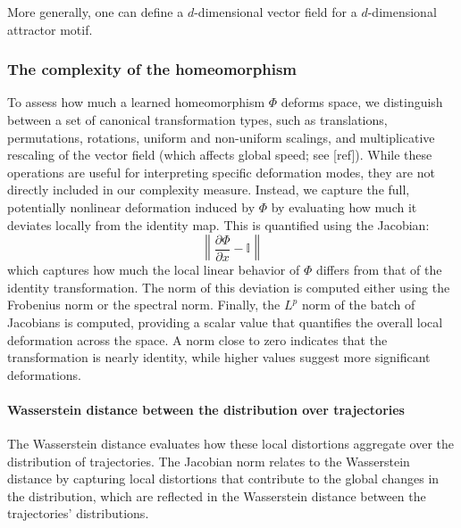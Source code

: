 \documentclass{article}
\theoremstyle{definition} \newtheorem{definition}{Definition}  \newtheorem{example}{Example}
\theoremstyle{remark} \newtheorem{remark}{Remark}
\newcounter{ct}
\begin{document}
More generally, one can define a $d$-dimensional vector field for a $d$-dimensional attractor motif.


\subsubsection{The complexity of the homeomorphism}
To assess how much a learned homeomorphism $\Phi$ deforms space, we distinguish between a set of canonical transformation types, such as translations, permutations, rotations, uniform and non-uniform scalings, and multiplicative rescaling of the vector field (which affects global speed; see [ref]).
 While these operations are useful for interpreting specific deformation modes, they are not directly included in our complexity measure.
Instead, we capture the full, potentially nonlinear deformation induced by $\Phi$ by evaluating how much it deviates locally from the identity map. This is quantified using the Jacobian:
\[
\left\|\frac{\partial \Phi}{\partial x} - \mathbb{I}\right\|
\]
which captures how much the local linear behavior of $\Phi$ differs from that of the identity transformation.
The norm of this deviation is computed either using the Frobenius norm or the spectral norm.
Finally, the \( L^p \) norm of the batch of Jacobians is computed, providing a scalar value that quantifies the overall local deformation across the space. A norm close to zero indicates that the transformation is nearly identity, while higher values suggest more significant deformations.


\paragraph{Wasserstein distance between the distribution over trajectories}
\citep{bion2019wasserstein}

The Wasserstein distance evaluates how these local distortions aggregate over the distribution of trajectories.
The Jacobian norm relates to the Wasserstein distance by capturing local distortions that contribute to the global changes in the distribution, which are reflected in the Wasserstein distance between the trajectories' distributions.
\end{document}
